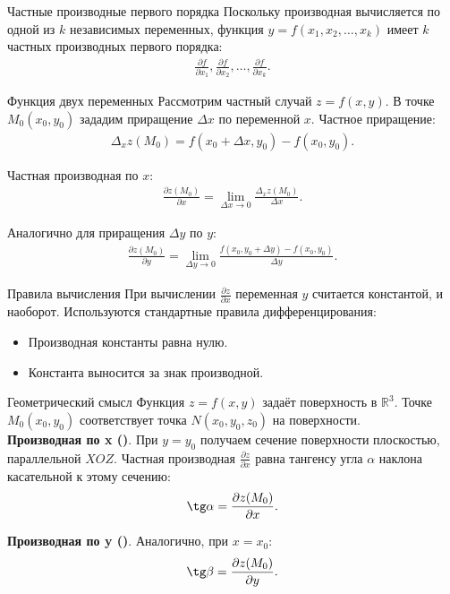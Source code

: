 \begin{tbox}{Частные производные первого порядка}
	Поскольку производная вычисляется по одной из \( k \) независимых переменных, функция \( y = f(x_1, x_2, \dots, x_k) \) имеет \( k \) частных производных первого порядка:
	\begin{align}
		\frac{\partial f}{\partial x_1}, \frac{\partial f}{\partial x_2}, \dots, \frac{\partial f}{\partial x_k}.
		\label{eq:19}
	\end{align}
\end{tbox}

\begin{tbox}{Функция двух переменных}
	Рассмотрим частный случай \( z = f(x, y) \). В точке \( M_0(x_0, y_0) \) зададим приращение \( \Delta x \) по переменной \( x \). Частное приращение:
	\begin{align}
		\Delta_x z(M_0) = f(x_0 + \Delta x, y_0) - f(x_0, y_0).
		\label{eq:20}
	\end{align}

	Частная производная по \( x \):
	\begin{align}
		\frac{\partial z(M_0)}{\partial x} = \lim_{\Delta x \to 0} \frac{\Delta_x z(M_0)}{\Delta x}.
		\label{eq:21}
	\end{align}

	Аналогично для приращения \( \Delta y \) по \( y \):
	\begin{align}
		\frac{\partial z(M_0)}{\partial y} = \lim_{\Delta y \to 0} \frac{f(x_0, y_0 + \Delta y) - f(x_0, y_0)}{\Delta y}.
		\label{eq:22}
	\end{align}
\end{tbox}

\begin{tbox*}{Правила вычисления}
	При вычислении \( \frac{\partial z}{\partial x} \) переменная \( y \) считается константой, и наоборот. Используются стандартные правила дифференцирования:
	\begin{itemize}
		\item Производная константы равна нулю.
		\item Константа выносится за знак производной.
	\end{itemize}
\end{tbox*}

\begin{tbox}{Геометрический смысл}
	Функция \( z = f(x, y) \) задаёт поверхность в \( \mathbb{R}^3 \). Точке \( M_0(x_0, y_0) \) соответствует точка \( N(x_0, y_0, z_0) \) на поверхности.\\

	\textbf{Производная по x ()}. При \( y = y_0 \) получаем сечение поверхности плоскостью, параллельной \( XOZ \). Частная производная \( \frac{\partial z}{\partial x} \) равна тангенсу угла \( \alpha \) наклона касательной к этому сечению:
	\[
	\tg \alpha = \frac{\partial z(M_0)}{\partial x}.
	\]

	\textbf{Производная по y ()}. Аналогично, при \( x = x_0 \):
	\[
	\tg \beta = \frac{\partial z(M_0)}{\partial y}.
	\]
\end{tbox}

